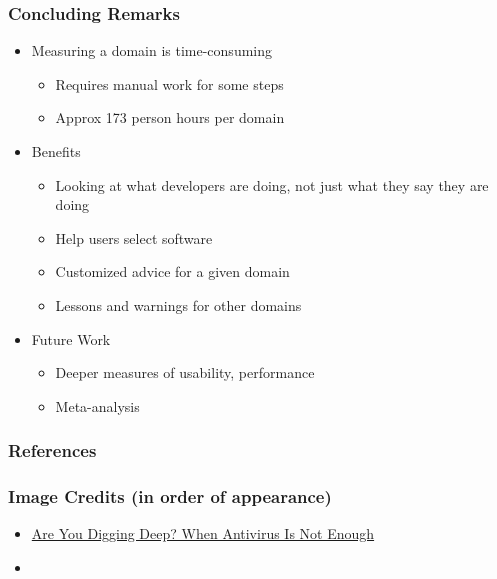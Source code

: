 \documentclass[usenames,dvipsnames]{beamer}
\begin{document}
\begin{frame}
  
  \frametitle{Concluding Remarks}
  
  \begin{itemize}
    \item Measuring a domain is time-consuming
    \begin{itemize}
      \item Requires manual work for some steps
      \item Approx 173 person hours per domain
    \end{itemize}
    \item Benefits
    \begin{itemize}
      \item Looking at what developers are doing, not just what they say they
      are doing
      \item Help users select software      
      \item Customized advice for a given domain
      \item Lessons and warnings for other domains
    \end{itemize}
    \item Future Work
    \begin{itemize}
      \item Deeper measures of usability, performance
      \item Meta-analysis
    \end{itemize}

  \end{itemize}
  
\end{frame}
    
  
\begin{frame}[allowframebreaks]
\frametitle{References}


\end{frame}


\begin{frame}
\frametitle{Image Credits (in order of appearance)}

\begin{itemize}
\item
\href{https://securityintelligence.com/are-you-digging-deep-when-antivirus-is-not-enough/} 
{Are You Digging Deep? When Antivirus Is Not Enough}
\item \citet{SadeghiEtAl2022b}
\end{itemize}

\end{frame}
  
\end{document}
